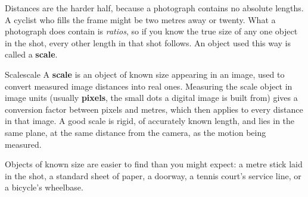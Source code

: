 \documentclass[11pt,twoside,openany]{book}
\begin{document}
Distances are the harder half, because a photograph contains no absolute lengths. A cyclist who fills the frame might be two metres away or twenty. What a photograph does contain is \emph{ratios}, so if you know the true size of any one object in the shot, every other length in that shot follows. An object used this way is called a \textbf{scale}.

\begin{definition}{Scale}{scale}
A \textbf{scale} is an object of known size appearing in an image, used to convert measured image distances into real ones. Measuring the scale object in image units (usually \textbf{pixels}, the small dots a digital image is built from) gives a conversion factor between pixels and metres, which then applies to every distance in that image. A good scale is rigid, of accurately known length, and lies in the same plane, at the same distance from the camera, as the motion being measured.
\end{definition}

Objects of known size are easier to find than you might expect: a metre stick laid in the shot, a standard sheet of paper, a doorway, a tennis court's service line, or a bicycle's wheelbase.
\end{document}

